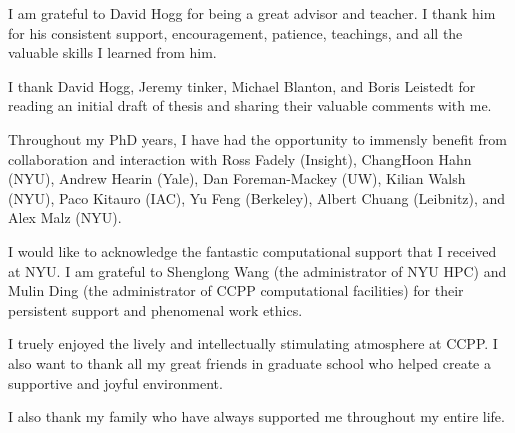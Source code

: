 I am grateful to David Hogg for being a great advisor and teacher. 
I thank him for his consistent support, encouragement, patience, teachings, 
and all the valuable skills I learned from him.

I thank David Hogg, Jeremy tinker, Michael Blanton, and Boris Leistedt for reading an initial draft of 
thesis and sharing their valuable comments with me.

Throughout my PhD years, I have had the opportunity to immensly benefit from collaboration and 
interaction with Ross Fadely (Insight), ChangHoon Hahn (NYU), Andrew Hearin (Yale), Dan Foreman-Mackey (UW), 
Kilian Walsh (NYU), Paco Kitauro (IAC), Yu Feng (Berkeley), Albert Chuang (Leibnitz), and Alex Malz (NYU).

I would like to acknowledge the fantastic computational support that I received at NYU. 
I am grateful to Shenglong Wang (the administrator of NYU HPC) and Mulin Ding (the administrator 
of CCPP computational facilities) for their persistent support and phenomenal work ethics. 


I truely enjoyed the lively and intellectually stimulating atmosphere at CCPP.
I also want to thank all my great friends in graduate school who helped create a 
supportive and joyful environment.  

I also thank my family who have always supported me throughout my entire life.


